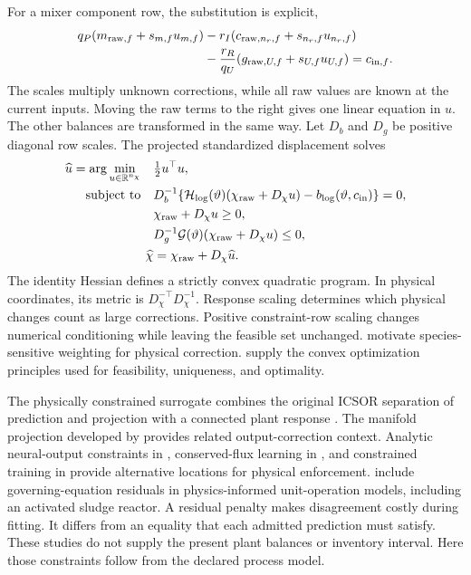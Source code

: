 For a mixer component row, the substitution is explicit,
\begin{align}
q_P(m_{{\rm raw},f}+s_{m,f}u_{m,f})
&-r_I(c_{{\rm raw},n_r,f}+s_{n_r,f}u_{n_r,f})\\
&-\frac{r_R}{q_U}(g_{{\rm raw},U,f}+s_{U,f}u_{U,f})
=c_{{\rm in},f}.
\end{align}
The scales multiply unknown corrections, while all raw values are known at the current inputs. Moving the raw terms to the right gives one linear equation in $u$. The other balances are transformed in the same way. Let $D_b$ and $D_g$ be positive diagonal row scales. The projected standardized displacement solves
\begin{align}
\widehat u=\arg\min_{u\in\mathbb R^{n_\chi}}\quad&\tfrac12u^\top u,\\
\text{subject to}\quad&
D_b^{-1}\{\mathcal H_{\log}(\vartheta)(\chi_{\rm raw}+D_\chi u)
-b_{\log}(\vartheta,c_{\rm in})\}=0,\notag\\
&\chi_{\rm raw}+D_\chi u\ge0,\notag\\
&D_g^{-1}\mathcal G(\vartheta)(\chi_{\rm raw}+D_\chi u)\le0,\notag\\
\widehat\chi&=\chi_{\rm raw}+D_\chi\widehat u.
\label{eq:plant_joint_projection}
\end{align}
The identity Hessian defines a strictly convex quadratic program. In physical coordinates, its metric is $D_\chi^{-\top}D_\chi^{-1}$. Response scaling determines which physical changes count as large corrections. Positive constraint-row scaling changes numerical conditioning while leaving the feasible set unchanged. \citet{SturmSilva2024} motivate species-sensitive weighting for physical correction. \citet{Boyd2004} supply the convex optimization principles used for feasibility, uniqueness, and optimality.

The physically constrained surrogate combines the original ICSOR separation of prediction and projection with a connected plant response \citep{Selerio2026}. The manifold projection developed by \citet{Valente2025} provides related output-correction context. Analytic neural-output constraints in \citet{Beucler2021}, conserved-flux learning in \citet{SturmWexler2020}, and constrained training in \citet{Ruckstuhl2021} provide alternative locations for physical enforcement. \citet{Li2024} include governing-equation residuals in physics-informed unit-operation models, including an activated sludge reactor. A residual penalty makes disagreement costly during fitting. It differs from an equality that each admitted prediction must satisfy. These studies do not supply the present plant balances or inventory interval. Here those constraints follow from the declared process model.

